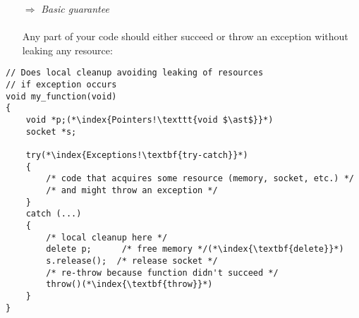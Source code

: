 \documentclass[10pt]{article}
\begin{document}
\begin{enumerate}
\item[$\Rightarrow$] \emph{Basic guarantee}\\ \\ Any part of your code should either succeed or throw an exception without leaking any resource:
\end{enumerate}
\begin{lstlisting}
// Does local cleanup avoiding leaking of resources
// if exception occurs
void my_function(void)
{
    void *p;(*\index{Pointers!\texttt{void $\ast$}}*) 
    socket *s;
    
    try(*\index{Exceptions!\textbf{try-catch}}*)
    {
        /* code that acquires some resource (memory, socket, etc.) */
        /* and might throw an exception */
    }
    catch (...)
    { 
        /* local cleanup here */
        delete p;      /* free memory */(*\index{\textbf{delete}}*)
        s.release();  /* release socket */  
        /* re-throw because function didn't succeed */
        throw()(*\index{\textbf{throw}}*)
    }    
}
\end{lstlisting}
%
%
\end{document}
